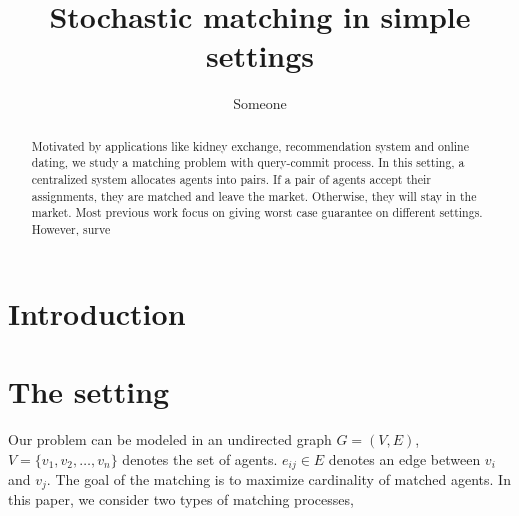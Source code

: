 \documentclass[letterpaper]{article}
\title {Stochastic matching in simple settings}
\author {Someone}
\begin{document}
%

\maketitle
\begin{abstract}
Motivated by applications like kidney exchange, recommendation system  and online dating, we study a matching problem with query-commit process.
In this setting, a centralized system allocates agents into pairs. If a pair of agents accept their assignments, they are matched and leave the market.
Otherwise, they will stay in the market.
Most previous work focus on giving worst case guarantee on different settings. 
However, surve
 


\end{abstract}

\section{Introduction}
\section{The setting}

Our problem can be modeled in an undirected graph $G=(V,E)$, $V=\{v_1,v_2,\ldots,v_n\}$ denotes the set of agents. $e_{ij}\in E$ denotes an edge between $v_i$ and $v_j$.
The goal of the matching is to maximize cardinality of matched agents.
In this paper, we consider two types of matching processes, 



\newpage


\end{document}
